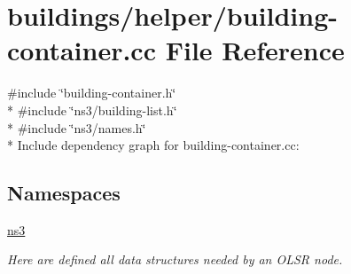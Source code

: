 \hypertarget{building-container_8cc}{}\section{buildings/helper/building-\/container.cc File Reference}
\label{building-container_8cc}
{\ttfamily \#include \char`\"{}building-\/container.\+h\char`\"{}}\\*
{\ttfamily \#include \char`\"{}ns3/building-\/list.\+h\char`\"{}}\\*
{\ttfamily \#include \char`\"{}ns3/names.\+h\char`\"{}}\\*
Include dependency graph for building-\/container.cc\+:
\subsection*{Namespaces}
\begin{DoxyCompactItemize}
\item 
 \hyperlink{namespacens3}{ns3}
\begin{DoxyCompactList}\small\item\em Here are defined all data structures needed by an O\+L\+SR node. \end{DoxyCompactList}\end{DoxyCompactItemize}
